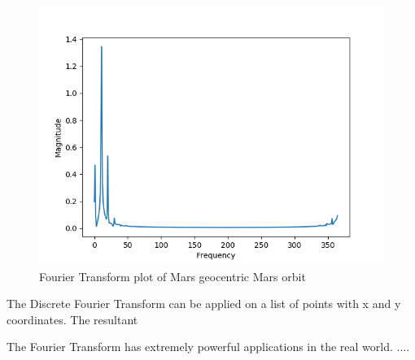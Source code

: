 \begin{figure}
    \centering
    \includegraphics{figures/mars_fft.png}
    \caption{Fourier Transform plot of Mars geocentric Mars orbit}
    \label{fig:my_label}
\end{figure}

The Discrete Fourier Transform can be applied on a list of points with x and y coordinates. The resultant

The Fourier Transform has extremely powerful applications in the real world. ....
